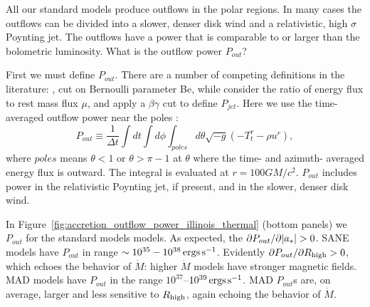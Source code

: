 All our standard models produce outflows in the polar regions.  In many cases the outflows can be divided into a slower, denser disk wind and a relativistic, high $\sigma$ Poynting jet.  The outflows have a power that is comparable to or larger than the bolometric luminosity.  What is the outflow power $P_{out}$?


First we must define $P_{out}$.  There are a number of competing definitions in the literature: \citet{refId0}, \citet{2014A&A...570A...7M} cut on  Bernoulli parameter Be, while \citealt{10.1111/j.1365-2966.2012.22002.x} consider the ratio of energy flux to rest mass flux $\mu$, and  apply a $\beta\gamma$ cut to define $P_{jet}$.  Here we use the time-averaged outflow power near the poles :
\begin{equation}
    P_{out} \equiv \frac{1}{\Delta t}\int dt \int d\phi \int_{poles}d\theta \sqrt{-g}\left(-T^{r}_{t}-\rho u^{r}\right),
\end{equation}
where $poles$ means $\theta<1$ or $\theta>\pi-1$ at $\theta$ where the time- and azimuth- averaged energy flux is outward. The integral is evaluated at $r=100GM/c^{2}$. $P_{out}$ includes power in the relativistic Poynting jet, if present, and in the slower, denser disk wind.

In Figure~\ref{fig:accretion_outflow_power_illinois_thermal}
(bottom panels) we $P_{out}$ for the standard models models. As expected, the $\partial P_{out}/\partial |a_*| > 0$. SANE models have $P_{out}$ in range $\sim 10^{35}-10^{38} \,\mathrm{ergs\,s^{-1}}$.  Evidently $\partial P_{out}/\partial R_\mathrm{high} > 0$, which echoes the behavior of $\dot{M}$: higher $\dot{M}$ models have stronger magnetic fields. MAD models have $P_{out}$ in the range $10^{37}$--$10^{39} \,\mathrm{ergs\,s^{-1}}$.  MAD $P_{out}$s are, on average, larger and less sensitive to $R_\mathrm{high}$, again echoing the behavior of $\dot{M}$.

